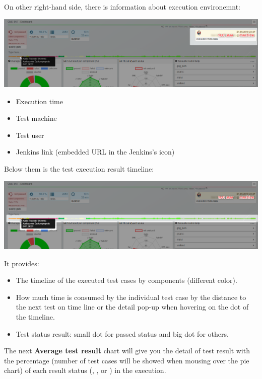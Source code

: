 On other right-hand side, there is information about execution environemnt:

\includegraphics[width=1\linewidth]{./pictures/dashboard/result_environment.png}
\begin{itemize}
   \item Execution time
   \item Test machine
   \item Test user
   \item Jenkins link (embedded URL in the Jenkins's icon)
\end{itemize}

Below them is the test execution result timeline:

\includegraphics[width=1\linewidth]{./pictures/dashboard/result_timeline.png}

It provides:
\begin{itemize}
   \item The timeline of the executed test cases by components 
         (different color).
   \item How much time is consumed by the individual test case by the distance 
         to the next test on time line or the detail pop-up when hovering on the 
         dot of the timeline.
   \item Test status result: small dot for passed status and big dot for others.
\end{itemize}


The next \textbf{Average test result} chart will give you the detail of test 
result with the percentage (number of test cases will be showed when mousing 
over the pie chart) of each result status (, , 
 or ) in the execution. 

